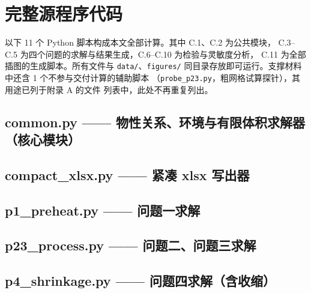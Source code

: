 \renewcommand{\thesubsection}{\Alph{section}.\arabic{subsection}}

\section{完整源程序代码}

以下 11 个 Python 脚本构成本文全部计算。其中 C.1、C.2 为公共模块，
C.3--C.5 为四个问题的求解与结果生成，C.6--C.10 为检验与灵敏度分析，
C.11 为全部插图的生成脚本。所有文件与 \texttt{data/}、\texttt{figures/}
同目录存放即可运行。支撑材料中还含 1 个不参与交付计算的辅助脚本
（\texttt{probe\_p23.py}，粗网格试算探针），其用途已列于附录 A 的文件
列表中，此处不再重复列出。

\subsection{common.py —— 物性关系、环境与有限体积求解器（核心模块）}


\subsection{compact\_xlsx.py —— 紧凑 xlsx 写出器}


\subsection{p1\_preheat.py —— 问题一求解}


\subsection{p23\_process.py —— 问题二、问题三求解}


\subsection{p4\_shrinkage.py —— 问题四求解（含收缩）}


